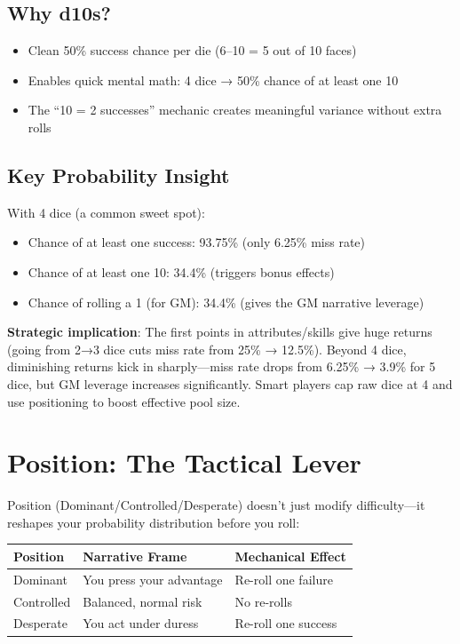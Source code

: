 \documentclass[11pt]{article}
\begin{document}
\subsection{Why d10s?}
\begin{itemize}
    \item Clean 50\% success chance per die (6–10 = 5 out of 10 faces)
    \item Enables quick mental math: 4 dice → 50\% chance of at least one 10
    \item The ``10 = 2 successes'' mechanic creates meaningful variance without extra rolls
\end{itemize}

\subsection{Key Probability Insight}
With 4 dice (a common sweet spot):
\begin{itemize}
    \item Chance of at least one success: 93.75\% (only 6.25\% miss rate)
    \item Chance of at least one 10: 34.4\% (triggers bonus effects)
    \item Chance of rolling a 1 (for GM): 34.4\% (gives the GM narrative leverage)
\end{itemize}

\textbf{Strategic implication}: The first points in attributes/skills give huge returns (going from 2→3 dice cuts miss rate from 25\% → 12.5\%). Beyond 4 dice, diminishing returns kick in sharply—miss rate drops from 6.25\% → 3.9\% for 5 dice, but GM leverage increases significantly. Smart players cap raw dice at 4 and use positioning to boost effective pool size.

\section{Position: The Tactical Lever}

Position (Dominant/Controlled/Desperate) doesn't just modify difficulty—it reshapes your probability distribution before you roll:

\begin{table}[h]
\centering
\begin{tabular}{lll}
\toprule
\textbf{Position} & \textbf{Narrative Frame} & \textbf{Mechanical Effect} \\
\midrule
Dominant & You press your advantage & Re-roll one failure \\
Controlled & Balanced, normal risk & No re-rolls \\
Desperate & You act under duress & Re-roll one success \\
\bottomrule
\end{tabular}
\end{table}
\end{document}
